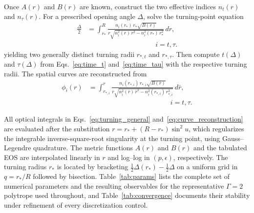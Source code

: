 \documentclass[
  aps,
  prd,
  twocolumn,
  nofootinbib,
  superscriptaddress,
  longbibliography
]{revtex4-2}
\begin{document}
Once $A(r)$ and $B(r)$ are known, construct the two effective indices
$n_t(r)$ and $n_\tau(r)$. For a prescribed opening angle $\Delta$,
solve the turning-point equation
\begin{align}
\frac{\Delta}{2}
&=
\int_{r_*}^{R}
\frac{
n_i(r_*)\,r_*\sqrt{B(r)}
}{
r\sqrt{
n_i^2(r)\,r^2
-
n_i^2(r_*)\,r_*^2
}
}
\,dr,
\nonumber\\
&\hspace{10em}
i=t,\tau.
\label{eq:turning_general}
\end{align}
yielding two generally distinct turning radii $r_{*,t}$ and
$r_{*,\tau}$. Then compute $t(\Delta)$ and $\tau(\Delta)$ from
Eqs.~\eqref{eq:time_t} and~\eqref{eq:time_tau} with the respective
turning radii. The spatial curves are reconstructed from
\begin{align}
\phi_i(r)
&=
\int_{r_{*,i}}^{r}
\frac{
n_i(r_{*,i})\,r_{*,i}\sqrt{B(\bar{r})}
}{
\bar{r}\sqrt{
n_i^2(\bar{r})\,\bar{r}^2
-
n_i^2(r_{*,i})\,r_{*,i}^2
}
}
\,d\bar{r},
\nonumber\\
&\hspace{12em}
i=t,\tau.
\label{eq:curve_reconstruction}
\end{align}

All optical integrals in Eqs.~\eqref{eq:turning_general}
and~\eqref{eq:curve_reconstruction} are evaluated after the
substitution $r=r_*+(R-r_*)\sin^2 u$, which regularizes the integrable
inverse-square-root singularity at the turning point, using
Gauss--Legendre quadrature. The metric functions $A(r)$ and $B(r)$ and
the tabulated EOS are interpolated linearly in $r$ and log--log in
$(p,\epsilon)$, respectively. The turning radius $r_*$ is located by
bracketing $\tfrac12\Delta(r_*)-\tfrac12\Delta$ on a uniform grid in
$q=r_*/R$ followed by bisection. Table~\ref{tab:params} lists the
complete set of numerical parameters and the resulting observables for
the representative $\Gamma=2$ polytrope used throughout, and
Table~\ref{tab:convergence} documents their stability under refinement
of every discretization control.
\end{document}
